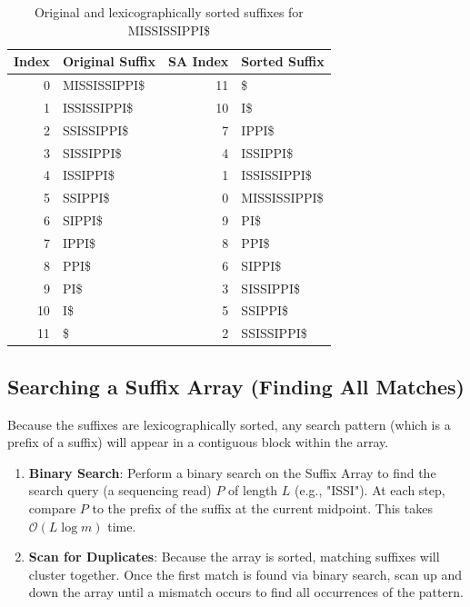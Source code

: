 \begin{table}[ht]
    \centering
    \begin{tabular}{r | l || r | l}
        \toprule
        \textbf{Index} & \textbf{Original Suffix} & \textbf{SA Index} & \textbf{Sorted Suffix} \\
        \midrule
        0  & MISSISSIPPI\$ & 11 & \$ \\
        1  & ISSISSIPPI\$  & 10 & I\$ \\
        2  & SSISSIPPI\$   & 7  & IPPI\$ \\
        3  & SISSIPPI\$    & 4  & ISSIPPI\$ \\
        4  & ISSIPPI\$     & 1  & ISSISSIPPI\$ \\
        5  & SSIPPI\$      & 0  & MISSISSIPPI\$ \\
        6  & SIPPI\$       & 9  & PI\$ \\
        7  & IPPI\$        & 8  & PPI\$ \\
        8  & PPI\$         & 6  & SIPPI\$ \\
        9  & PI\$          & 3  & SISSIPPI\$ \\
        10 & I\$           & 5  & SSIPPI\$ \\
        11 & \$            & 2  & SSISSIPPI\$ \\
        \bottomrule
    \end{tabular}
    \caption*{Original and lexicographically sorted suffixes for MISSISSIPPI\$}
\end{table}

\subsection{Searching a Suffix Array (Finding All Matches)}

Because the suffixes are lexicographically sorted, any search pattern (which is a prefix of a suffix) will appear in a contiguous block within the array.
\begin{enumerate}
    \item \textbf{Binary Search}: Perform a binary search on the Suffix Array to find the search query (a sequencing read) $P$ of length $L$ (e.g., "ISSI"). At each step, compare $P$ to the prefix of the suffix at the current midpoint. This takes \(\mathcal{O}(L \log m)\) time.
    \item \textbf{Scan for Duplicates}: Because the array is sorted, matching suffixes will cluster together. Once the first match is found via binary search, scan up and down the array until a mismatch occurs to find all occurrences of the pattern.
\end{enumerate}


